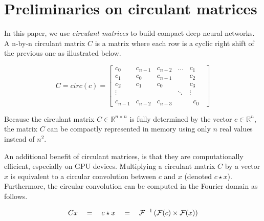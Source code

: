 \documentclass[runningheads]{llncs}
\newcommand{\F}{{\ensuremath \mathcal F}}
\begin{document}
\section{Preliminaries on circulant matrices}
\label{sec:circ}

In this paper, we use {\em circulant matrices} to build compact deep neural networks. A n-by-n circulant matrix $C$ is a matrix where each row is a cyclic right shift of the previous one as illustrated below.

\[
C = circ(c) =\left[\begin{array}{ccccc}
c_{0} & c_{n-1} & c_{n-2} & \dots & c_{1} \\
c_{1} & c_{0} & c_{n-1} & & c_{2} \\
c_{2} & c_{1} & c_{0}& & c_{3} \\
\vdots & & & \ddots & \vdots \\
c_{n-1} & c_{n-2} & c_{n-3} & & \phantom{0}c_{0}\phantom{0}
\end{array}\right]
\]

Because the circulant matrix $C \in \mathbb R^{n\times n}$ is fully determined by the vector $c \in \mathbb R^n$, the matrix $C$ can be compactly represented in memory using only $n$ real values instead of $n^2$.

An additional benefit of circulant matrices, is that they are computationally efficient, especially on GPU devices. Multiplying a circulant matrix $C$ by a vector $x$ is equivalent to a circular convolution between $c$ and $x$ (denoted $c \star x$). Furthermore, the circular convolution can be computed in the Fourier domain as follows.

\begin{equation*}
  Cx \quad = \quad c \star x \quad = \quad \F^{-1}\left(\F(c) \times \F(x)\right)
\end{equation*}
\end{document}
